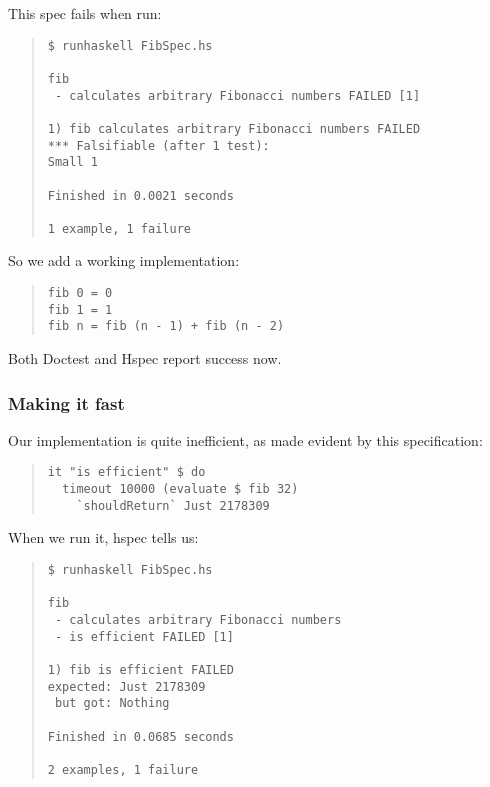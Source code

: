 \documentclass[preprint]{sigplanconf}
\begin{document}
\noindent This spec fails when run:

\begin{quote}
\small
\begin{verbatim}
$ runhaskell FibSpec.hs

fib
 - calculates arbitrary Fibonacci numbers FAILED [1]

1) fib calculates arbitrary Fibonacci numbers FAILED
*** Falsifiable (after 1 test):
Small 1

Finished in 0.0021 seconds

1 example, 1 failure
\end{verbatim}
\end{quote}

\noindent So we add a working implementation:

\begin{quote}
\small
\begin{verbatim}
fib 0 = 0
fib 1 = 1
fib n = fib (n - 1) + fib (n - 2)
\end{verbatim}
\end{quote}

\noindent Both Doctest and Hspec report success now.


\subsubsection{Making it fast}

Our implementation is quite inefficient, as made evident by this
specification:

\begin{quote}
\small
\begin{verbatim}
it "is efficient" $ do
  timeout 10000 (evaluate $ fib 32)
    `shouldReturn` Just 2178309
\end{verbatim}
\end{quote}

\noindent When we run it, hspec tells us:

\begin{quote}
\small
\begin{verbatim}
$ runhaskell FibSpec.hs

fib
 - calculates arbitrary Fibonacci numbers
 - is efficient FAILED [1]

1) fib is efficient FAILED
expected: Just 2178309
 but got: Nothing

Finished in 0.0685 seconds

2 examples, 1 failure
\end{verbatim}
\end{quote}
\end{document}
